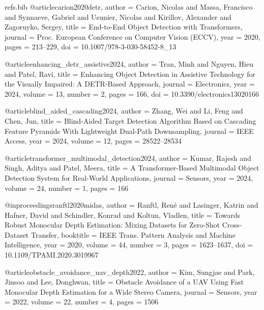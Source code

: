 \begin{filecontents*}{refs.bib}
@article{carion2020detr,
  author    = {Carion, Nicolas and Massa, Francisco and Synnaeve, Gabriel and Usunier, Nicolas and Kirillov, Alexander and Zagoruyko, Sergey},
  title     = {End-to-End Object Detection with Transformers},
  journal   = {Proc. European Conference on Computer Vision (ECCV)},
  year      = {2020},
  pages     = {213--229},
  doi       = {10.1007/978-3-030-58452-8_13}
}

@article{enhancing_detr_assistive2024,
  author    = {Tran, Minh and Nguyen, Hieu and Patel, Ravi},
  title     = {Enhancing Object Detection in Assistive Technology for the Visually Impaired: A {DETR}-Based Approach},
  journal   = {Electronics},
  year      = {2024},
  volume    = {13},
  number    = {2},
  pages     = {166},
  doi       = {10.3390/electronics13020166}
}

@article{blind_aided_cascading2024,
  author    = {Zhang, Wei and Li, Feng and Chen, Jun},
  title     = {Blind-Aided Target Detection Algorithm Based on Cascading Feature Pyramids With Lightweight Dual-Path Downsampling},
  journal   = {IEEE Access},
  year      = {2024},
  volume    = {12},
  pages     = {28522--28534}
}

@article{transformer_multimodal_detection2024,
  author    = {Kumar, Rajesh and Singh, Aditya and Patel, Meera},
  title     = {A Transformer-Based Multimodal Object Detection System for Real-World Applications},
  journal   = {Sensors},
  year      = {2024},
  volume    = {24},
  number    = {1},
  pages     = {166}
}


@inproceedings{ranftl2020midas,
  author    = {Ranftl, Ren{\'e} and Lasinger, Katrin and Hafner, David and Schindler, Konrad and Koltun, Vladlen},
  title     = {Towards Robust Monocular Depth Estimation: Mixing Datasets for Zero-Shot Cross-Dataset Transfer},
  booktitle = {IEEE Trans. Pattern Analysis and Machine Intelligence},
  year      = {2020},
  volume    = {44},
  number    = {3},
  pages     = {1623--1637},
  doi       = {10.1109/TPAMI.2020.3019967}
}

@article{obstacle_avoidance_uav_depth2022,
  author    = {Kim, Sungjae and Park, Jinsoo and Lee, Donghwan},
  title     = {Obstacle Avoidance of a {UAV} Using Fast Monocular Depth Estimation for a Wide Stereo Camera},
  journal   = {Sensors},
  year      = {2022},
  volume    = {22},
  number    = {4},
  pages     = {1506}
}



\end{filecontents*}
